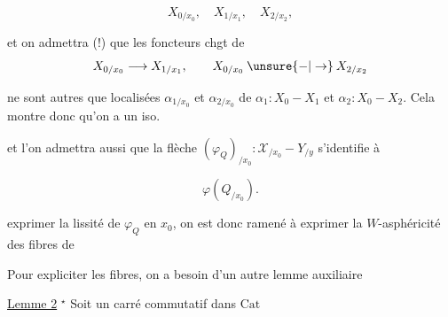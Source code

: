 \[
X_{0/x_0},\quad X_{1/x_1},\quad X_{2/x_2},
\]

et on admettra (!) que les foncteurs chgt de
\[
X_{0/x_0}\longrightarrow X_{1/x_1},\qquad X_{0/x_0}\mathbin{\unsure{-|\to}} X_{2/x_2}
\]

 ne sont autres que  localisées $\alpha_{1/x_0}$ et $\alpha_{2/x_0}$ de $\alpha_1:X_0\mathbin{-}X_1$ et $\alpha_2:X_0\mathbin{-}X_2$. Cela montre donc qu'on a un iso.


et l'on admettra aussi que la flèche $(\varphi_Q)_{/x_0}:\mathscr X_{/x_0}\mathbin{-}Y_{/y}$ s'identifie à

\[
\varphi(Q_{/x_0}).
\]

 exprimer la lissité de $\varphi_Q$ en $x_0$, on est donc ramené à exprimer la $W$-asphéricité des fibres de


Pour expliciter les fibres, on a besoin d'un autre lemme auxiliaire

\uline{Lemme 2} $^{\star}$ Soit un carré commutatif dans $\mathrm{Cat}$



